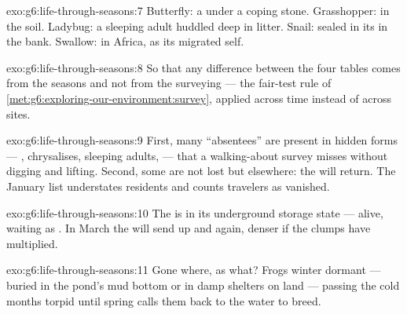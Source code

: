 \begin{solution}{exo:g6:life-through-seasons:7}
Butterfly: a  under a coping stone. Grasshopper:
 in the soil. Ladybug: a sleeping adult huddled deep in
 litter. Snail: sealed in its  in the bank. Swallow:
in Africa, as its migrated self.
\end{solution}

\begin{solution}{exo:g6:life-through-seasons:8}
So that any difference between the four tables comes from
the seasons and not from the surveying --- the fair-test
rule of \cref{met:g6:exploring-our-environment:survey},
applied across time instead of across sites.
\end{solution}

\begin{solution}{exo:g6:life-through-seasons:9}
First, many ``absentees'' are present in hidden forms ---
, chrysalises, sleeping adults,  --- that a
walking-about survey misses without digging and lifting.
Second, some are not lost but elsewhere: the  will
return. The January list understates residents and counts
travelers as vanished.
\end{solution}

\begin{solution}{exo:g6:life-through-seasons:10}
The  is in its underground storage state --- alive,
waiting as . In March the  will send up  and
 again, denser if the clumps have multiplied.
\end{solution}

\begin{solution}{exo:g6:life-through-seasons:11}
Gone where, as what? Frogs winter dormant --- buried in the
pond's mud bottom or in damp shelters on land --- passing
the cold months torpid until spring calls them back to the
water to breed.
\end{solution}

